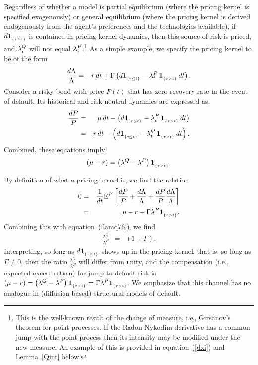 \documentclass[titlepage,11pt]{article}
\def\by{\begin{eqnarray}}
\def\ey{\end{eqnarray}}
\def\nn{\nonumber}
\begin{document}
Regardless of whether a model is partial equilibrium (where the pricing kernel
is specified exogenously) or general equilibrium (where the pricing kernel is derived
endogenously from the agent's preferences and the technologies available),
if $d{\bf 1}_{_{{\left\{{\tau\leq t}\right\}}}}$ is contained in pricing kernel dynamics, then this source of risk is priced, and
$\lambda^{Q}_{_{{t}}}$ will not equal $\lambda^{P}_{_{{t}}}$.\footnote{This is the well-known result
of the change of measure, i.e., Girsanov's theorem for point processes. If the
Radon-Nykodim derivative has a common jump with the point process then its intensity may
be modified under the new measure. An example of this is
provided in equation~(\protect\ref{dxi}) and Lemma~\protect\ref{Qint} below.}
As a simple example, we specify the pricing kernel to be of the form
\by\label{sdf93}
\frac{d\Lambda}{\Lambda} = -r \, dt
+ \Gamma \left( d\ind{\tau\leq t} - \lambda^{P}_t \, \ind{\tau >t} \, dt \right).
\ey
Consider a risky bond with price $P(t)$ that has zero
recovery rate in the event of default. Its historical and risk-neutral dynamics are expressed as:
\by
\frac{dP}{P} &=& \mu \, dt - \left( d\ind{\tau\leq t} - \lambda^{P}_t \, \ind{\tau >t} \, dt \right) \\
%
&=& r \, dt - \left( d\ind{\tau\leq t} - \lambda^{Q}_t \, \ind{\tau >t} \, dt \right).
\ey
Combined, these equations imply:
\by\label{lamq76}
\left( \mu - r \right) = \left( \lambda^{Q} - \lambda^{P} \right) \ind{\tau >t}.
\ey

By definition of what a pricing kernel is, we find the relation
\by
0 &=& \frac{1}{dt} \mbox{E}^{P} \left[ \frac{dP}{P} + \frac{d\Lambda}{\Lambda}
+ \frac{dP}{P}\frac{d \Lambda}{\Lambda} \right] \nn \\
%
&=& \mu - r - \Gamma \lambda^{P} \ind{\tau >t}.
\ey
Combining this with equation~(\ref{lamq76}), we find
\by
\frac{\lambda^{Q}}{\lambda^{P}} &=& \left( 1 + \Gamma \right).
\ey
Interpreting, so long as $d{\bf 1}_{_{{\left\{{\tau\leq t}\right\}}}}$ shows up in the pricing kernel, that is, so
long as $\Gamma \neq 0$, then the ratio $\frac{\lambda^{Q}}{\lambda^{P}}$ will differ from unity,
and the compensation (i.e., expected excess return) for jump-to-default risk is
$\left( \mu - r \right) = \left( \lambda^{Q} - \lambda^{P} \right) {\bf 1}_{_{{\left\{{\tau >t}\right\}}}} = \Gamma \lambda^{P} {\bf 1}_{_{{\left\{{\tau >t}\right\}}}}$.
We emphasize that this channel has no analogue in (diffusion based) structural models of default.
\end{document}

